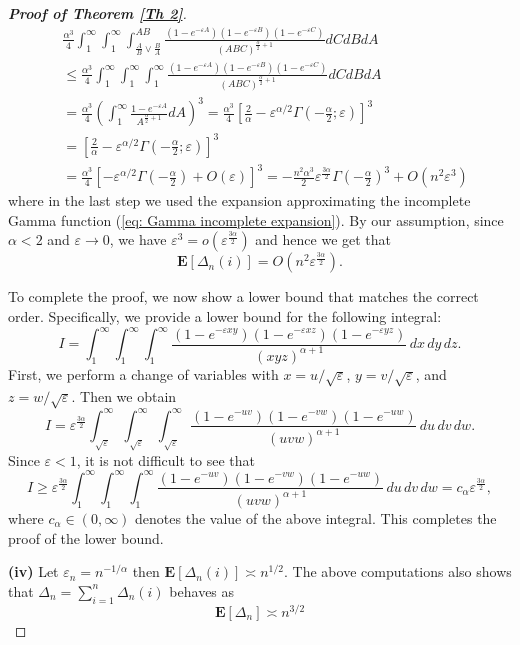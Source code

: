 \documentclass[11pt, reqno]{amsart}
\numberwithin{equation}{section}
\renewcommand{\o}[1]{o\left(#1\right)}
\renewcommand{\O}[1]{O\left(#1\right)}
\theoremstyle{plain} %
\theoremstyle{definition} %
\newcommand{\eps}{\varepsilon}
\newcommand{\E}{\mathbf{E}}
\begin{document}
\begin{proof}[{\bf Proof of Theorem \ref{Th 2}}]
{\[
\begin{split}
&\frac{\alpha^3}{4} \int_1^{\infty} \int_1^{\infty} \int_{\frac{A}{B}\vee \frac{B}{A}}^{AB} \frac{(1-e^{-\eps A}) (1-e^{-\eps B})(1-e^{-\eps C}) }{(ABC)^{\frac{\alpha}{2} +1}} dC dB dA\\
&\le \frac{\alpha^3}{4} \int_1^{\infty} \int_1^{\infty} \int_1^\infty \frac{(1-e^{-\eps A}) (1-e^{-\eps B})(1-e^{-\eps C}) }{(ABC)^{\frac{\alpha}{2} +1}} dC dB dA \\
&=\frac{\alpha^3}{4}\left(\int_1^\infty \frac{1-e^{-\eps A}}{A^{\frac{\alpha}{2}+1}}dA
\right)^3=\frac{\alpha^3}{4}\left[\frac{2}{\alpha} - \eps^{\alpha/2} \Gamma \left(-\frac{\alpha}{2};\eps \right)   \right]^3\\
&= \left[\frac{2}{\alpha} - \eps^{\alpha/2} \Gamma \left(-\frac{\alpha}{2};\eps \right)   \right]^3 \\
        & = \frac{\alpha^3}{4}    \left[  -\eps^{\alpha/2} \Gamma\left(-\frac{\alpha}{2}\right)+\O{\eps} \right]^3  = - \frac{n^2 \alpha^3}{2}    \eps^{\frac{3\alpha}{2}} \Gamma\left(-\frac{\alpha}{2} \right) ^3+ \O{n^2 \eps^3}
\end{split}
\]
where in the last step we used the expansion approximating the incomplete Gamma function (\ref{eq: Gamma incomplete expansion}). By our assumption, since $\alpha<2$ and $\eps\to 0$, we have $\eps^3=\o{\eps^{\frac{3\alpha}{2}}}$ and hence we get that
$$\mathbf{E}\left[\Delta_n(i)\right]  =\O{n^2\eps^{\frac{3\alpha}{2}}}.$$


To complete the proof, we now show a lower bound that matches the correct order. Specifically, we provide a lower bound for the following integral:
\[
I= \int_1^{\infty} \int_1^{\infty}  \int_1^{\infty}  \frac{(1-e^{-\eps xy}) (1-e^{-\eps xz})(1-e^{-\eps yz}) }{(xyz)^{\alpha +1}}\, dx\, dy \, dz.
\]
First, we perform a change of variables with \( x= u/\sqrt{\eps} \), \( y= v/\sqrt{\eps} \), and \( z= w/\sqrt{\eps} \). Then we obtain
\[
I = \eps^{\frac{3\alpha}{2}} \int_{\sqrt{\eps}}^\infty \int_{\sqrt{\eps}}^\infty \int_{\sqrt{\eps}}^\infty \frac{(1-e^{-uv}) (1-e^{-vw})(1-e^{-uw}) }{(uvw)^{\alpha +1}} \, du \, dv \, dw.
\]
Since \( \eps < 1 \), it is not difficult to see that
\[
I \geq \eps^{\frac{3\alpha}{2}} \int_{1}^\infty \int_{1}^\infty \int_{1}^\infty \frac{(1-e^{-uv}) (1-e^{-vw})(1-e^{-uw}) }{(uvw)^{\alpha +1}} \, du \, dv \, dw = c_{\alpha} \eps^{\frac{3\alpha}{2}},
\]
where \( c_{\alpha} \in (0,\infty) \) denotes the value of the above integral. This completes the proof of the lower bound.

}
{\bf (iv)} Let $\eps_n= n^{-1/\alpha}$ then $\E[ \Delta_n(i)] \asymp n^{1/2}$. The above computations also shows that $\Delta_n=\sum_{i=1}^n \Delta_n(i)$ behaves as 
\begin{equation}\label{eq:epsDelta}\E[\Delta_n]\asymp  n^{3/2}
\end{equation}


\end{proof}
\end{document}
